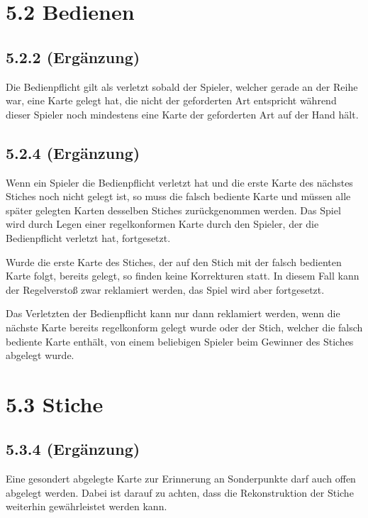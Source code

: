 \section*{5.2 Bedienen}

\subsection*{5.2.2 (Ergänzung)}

Die Bedienpflicht gilt als verletzt sobald der Spieler, welcher gerade an der
Reihe war, eine Karte gelegt hat, die nicht der geforderten Art entspricht
während dieser Spieler noch mindestens eine Karte der geforderten Art auf der
Hand hält.

\subsection*{5.2.4 (Ergänzung)}

Wenn ein Spieler die Bedienpflicht verletzt hat und die erste Karte des nächstes
Stiches noch nicht gelegt ist, so muss die falsch bediente Karte und müssen alle
später gelegten Karten desselben Stiches zurückgenommen werden. Das Spiel wird
durch Legen einer regelkonformen Karte durch den Spieler, der die Bedienpflicht
verletzt hat, fortgesetzt.

Wurde die erste Karte des Stiches, der auf den Stich mit der falsch bedienten
Karte folgt, bereits gelegt, so finden keine Korrekturen statt. In diesem Fall
kann der Regelverstoß zwar reklamiert werden, das Spiel wird aber fortgesetzt.

Das Verletzten der Bedienpflicht kann nur dann reklamiert werden, wenn die
nächste Karte bereits regelkonform gelegt wurde oder der Stich, welcher die
falsch bediente Karte enthält, von einem beliebigen Spieler beim Gewinner des
Stiches abgelegt wurde.

\section*{5.3 Stiche}

\subsection*{5.3.4 (Ergänzung)}

Eine gesondert abgelegte Karte zur Erinnerung an Sonderpunkte darf auch
offen abgelegt werden. Dabei ist darauf zu achten, dass die
Rekonstruktion der Stiche weiterhin gewährleistet werden kann.

